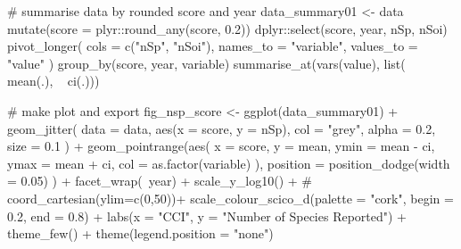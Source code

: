 \documentclass[]{article}
\newenvironment{Shaded}{}{}
\newcommand{\CommentTok}[1]{\textcolor[rgb]{0.00,0.50,0.00}{#1}}
\newcommand{\DataTypeTok}[1]{#1}
\newcommand{\FloatTok}[1]{#1}
\newcommand{\KeywordTok}[1]{\textcolor[rgb]{0.00,0.00,1.00}{#1}}
\newcommand{\NormalTok}[1]{#1}
\newcommand{\OperatorTok}[1]{#1}
\newcommand{\StringTok}[1]{\textcolor[rgb]{0.00,0.50,0.50}{#1}}
\begin{document}
\begin{Shaded}
\begin{Highlighting}[numbers=left,,]
\CommentTok{# summarise data by rounded score and year}
\NormalTok{data_summary01 <-}\StringTok{ }\NormalTok{data }\OperatorTok{%
\StringTok{  }\KeywordTok{mutate}\NormalTok{(}\DataTypeTok{score =}\NormalTok{ plyr}\OperatorTok{::}\KeywordTok{round_any}\NormalTok{(score, }\FloatTok{0.2}\NormalTok{)) }\OperatorTok{%
\StringTok{  }\NormalTok{dplyr}\OperatorTok{::}\KeywordTok{select}\NormalTok{(score, year, nSp, nSoi) }\OperatorTok{%
\StringTok{  }\KeywordTok{pivot_longer}\NormalTok{(}
    \DataTypeTok{cols =} \KeywordTok{c}\NormalTok{(}\StringTok{"nSp"}\NormalTok{, }\StringTok{"nSoi"}\NormalTok{),}
    \DataTypeTok{names_to =} \StringTok{"variable"}\NormalTok{, }\DataTypeTok{values_to =} \StringTok{"value"}
\NormalTok{  ) }\OperatorTok{%
\StringTok{  }\KeywordTok{group_by}\NormalTok{(score, year, variable) }\OperatorTok{%
\StringTok{  }\KeywordTok{summarise_at}\NormalTok{(}\KeywordTok{vars}\NormalTok{(value), }\KeywordTok{list}\NormalTok{(}\OperatorTok{~}\StringTok{ }\KeywordTok{mean}\NormalTok{(.), }\OperatorTok{~}\StringTok{ }\KeywordTok{ci}\NormalTok{(.)))}

\CommentTok{# make plot and export}
\NormalTok{fig_nsp_score <-}
\StringTok{  }\KeywordTok{ggplot}\NormalTok{(data_summary01) }\OperatorTok{+}
\StringTok{  }\KeywordTok{geom_jitter}\NormalTok{(}
    \DataTypeTok{data =}\NormalTok{ data, }\KeywordTok{aes}\NormalTok{(}\DataTypeTok{x =}\NormalTok{ score, }\DataTypeTok{y =}\NormalTok{ nSp),}
    \DataTypeTok{col =} \StringTok{"grey"}\NormalTok{, }\DataTypeTok{alpha =} \FloatTok{0.2}\NormalTok{, }\DataTypeTok{size =} \FloatTok{0.1}
\NormalTok{  ) }\OperatorTok{+}
\StringTok{  }\KeywordTok{geom_pointrange}\NormalTok{(}\KeywordTok{aes}\NormalTok{(}
    \DataTypeTok{x =}\NormalTok{ score, }\DataTypeTok{y =}\NormalTok{ mean,}
    \DataTypeTok{ymin =}\NormalTok{ mean }\OperatorTok{-}\StringTok{ }\NormalTok{ci, }\DataTypeTok{ymax =}\NormalTok{ mean }\OperatorTok{+}\StringTok{ }\NormalTok{ci,}
    \DataTypeTok{col =} \KeywordTok{as.factor}\NormalTok{(variable)}
\NormalTok{  ),}
  \DataTypeTok{position =} \KeywordTok{position_dodge}\NormalTok{(}\DataTypeTok{width =} \FloatTok{0.05}\NormalTok{)}
\NormalTok{  ) }\OperatorTok{+}
\StringTok{  }\KeywordTok{facet_wrap}\NormalTok{(}\OperatorTok{~}\NormalTok{year) }\OperatorTok{+}
\StringTok{  }\KeywordTok{scale_y_log10}\NormalTok{() }\OperatorTok{+}
\StringTok{  }\CommentTok{#  coord_cartesian(ylim=c(0,50))+}
\StringTok{  }\KeywordTok{scale_colour_scico_d}\NormalTok{(}\DataTypeTok{palette =} \StringTok{"cork"}\NormalTok{, }\DataTypeTok{begin =} \FloatTok{0.2}\NormalTok{, }\DataTypeTok{end =} \FloatTok{0.8}\NormalTok{) }\OperatorTok{+}
\StringTok{  }\KeywordTok{labs}\NormalTok{(}\DataTypeTok{x =} \StringTok{"CCI"}\NormalTok{, }\DataTypeTok{y =} \StringTok{"Number of Species Reported"}\NormalTok{) }\OperatorTok{+}
\StringTok{  }\KeywordTok{theme_few}\NormalTok{() }\OperatorTok{+}
\StringTok{  }\KeywordTok{theme}\NormalTok{(}\DataTypeTok{legend.position =} \StringTok{"none"}\NormalTok{)}

}}}}}
\end{Highlighting}
\end{Shaded}
\end{document}
